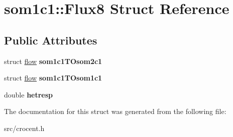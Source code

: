 \hypertarget{structsom1c1_1_1_flux8}{\section{som1c1\-:\-:Flux8 Struct Reference}
\label{structsom1c1_1_1_flux8}
}
\subsection*{Public Attributes}
\begin{DoxyCompactItemize}
\item 
\hypertarget{structsom1c1_1_1_flux8_a7d542e43db4e503d5a5dd42bfd258183}{struct \hyperlink{structflow}{flow} {\bfseries som1c1\-T\-Osom2c1}}\label{structsom1c1_1_1_flux8_a7d542e43db4e503d5a5dd42bfd258183}

\item 
\hypertarget{structsom1c1_1_1_flux8_a6742bd6d64148b4e5db8b5c4b620c6bf}{struct \hyperlink{structflow}{flow} {\bfseries som1c1\-T\-Osom1c1}}\label{structsom1c1_1_1_flux8_a6742bd6d64148b4e5db8b5c4b620c6bf}

\item 
\hypertarget{structsom1c1_1_1_flux8_ae0495ecc3a24d4c02374460cc0ae65c8}{double {\bfseries hetresp}}\label{structsom1c1_1_1_flux8_ae0495ecc3a24d4c02374460cc0ae65c8}

\end{DoxyCompactItemize}


The documentation for this struct was generated from the following file\-:\begin{DoxyCompactItemize}
\item 
src/crocent.\-h\end{DoxyCompactItemize}
